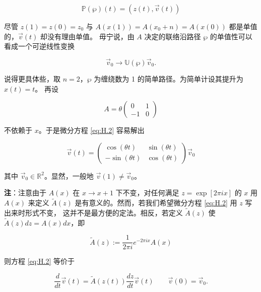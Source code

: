 \begin{equation}
  \mathbb{P}(\wp)(t) = (z(t),\vec{v}(t))
  \tag{H.17}
  \label{eq:H.17}
\end{equation}

尽管 $z(1)=z(0)=z_0$ 与 $A(x(1))=A(x_0+n)=A(x(0))$ 都是单值的，$\vec{v}(t)$ 却没有理由单值。
毋宁说，由 $A$ 决定的联络沿路径 $\wp$ 的单值性可以看成一个可逆线性变换

\begin{equation}
  \vec{v}_0 \to \mathbb{U}(\wp)\vec{v}_0.
  \tag{H.18}
  \label{eq:H.18}
\end{equation}

说得更具体些，取 $n=2$，$\wp$ 为缠绕数为 1 的简单路径。为简单计设其提升为 $x(t)=t$。
再设

\begin{equation}
  A = \theta\begin{pmatrix} 0 & 1 \\ -1 & 0 \end{pmatrix}
  \tag{H.19}
  \label{eq:H.19}
\end{equation}

不依赖于 $x$。于是微分方程 \eqref{eq:H.2} 容易解出

\begin{equation}
  \vec{v}(t) = \begin{pmatrix} \cos(\theta t) & \sin(\theta t) \\
  -\sin(\theta t) & \cos(\theta t) \end{pmatrix}\vec{v}_0
  \tag{H.20}
  \label{eq:H.20}
\end{equation}

其中 $\vec{v}_0\in\mathbb{R}^2$。显然，一般地 $\vec{v}(1)\neq\vec{v}_0$。

\textbf{注}：注意由于 $A(x)$ 在 $x\to x+1$ 下不变，对任何满足 $z=\exp[2\pi i x]$ 的 $x$ 用 $A(x)$
来定义 $\tilde{A}(z)$ 是有意义的。然而，若我们希望微分方程 \eqref{eq:H.2} 用 $z$ 写出来时形式不变，
这并不是最方便的定法。相反，若定义 $\tilde{A}(z)$ 使 $\tilde{A}(z)dz=A(x)dx$，即

\begin{equation}
  \tilde{A}(z) := \frac{1}{2\pi i}e^{-2\pi i x}A(x)
  \tag{H.21}
  \label{eq:H.21}
\end{equation}

则方程 \eqref{eq:H.2} 等价于

\begin{equation}
  \frac{d}{dt}\vec{v}(t) = \tilde{A}(z(t))\frac{dz}{dt}\vec{v}(t)
  \qquad \vec{v}(0)=\vec{v}_0.
  \tag{H.22}
  \label{eq:H.22}
\end{equation}

